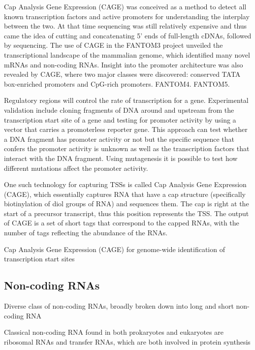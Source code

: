 Cap Analysis Gene Expression (CAGE) was conceived as a method to detect all known transcription factors and active promoters for understanding the interplay between the two\cite{carninci2010capanalysis}. At that time sequencing was still relatively expensive and thus came the idea of cutting and concatenating 5' ends of full-length cDNAs, followed by sequencing. The use of CAGE in the FANTOM3 project unveiled the transcriptional landscape of the mammalian genome\cite{pmid16141072}, which identified many novel mRNAs and non-coding RNAs. Insight into the promoter architecture was also revealed by CAGE, where two major classes were discovered: conserved TATA box-enriched promoters and CpG-rich promoters\cite{pmid16645617}. FANTOM4\cite{pmid19377474}. FANTOM5\cite{pmid24670764}.

Regulatory regions will control the rate of transcription for a gene. Experimental validation include cloning fragments of DNA around and upstream from the transcription start site of a gene and testing for promoter activity by using a vector that carries a promoterless reporter gene. This approach can test whether a DNA fragment has promoter activity or not but the specific sequence that confers the promoter activity is unknown as well as the transcription factors that interact with the DNA fragment. Using mutagenesis it is possible to test how different mutations affect the promoter activity.

One such technology for capturing TSSs is called Cap Analysis Gene Expression (CAGE), which essentially captures RNA that have a cap structure (specifically biotinylation of diol groups of RNA\cite{pmid8938445}) and sequences them. The cap is right at the start of a precursor transcript, thus this position represents the TSS. The output of CAGE is a set of short tags that correspond to the capped RNAs, with the number of tags reflecting the abundance of the RNAs.

Cap Analysis Gene Expression (CAGE) for genome-wide identification of transcription start sites

\subsection{Non-coding RNAs}

Diverse class of non-coding RNAs, broadly broken down into long and short non-coding RNA

Classical non-coding RNA found in both prokaryotes and eukaryotes are ribosomal RNAs and transfer RNAs, which are both involved in protein synthesis

